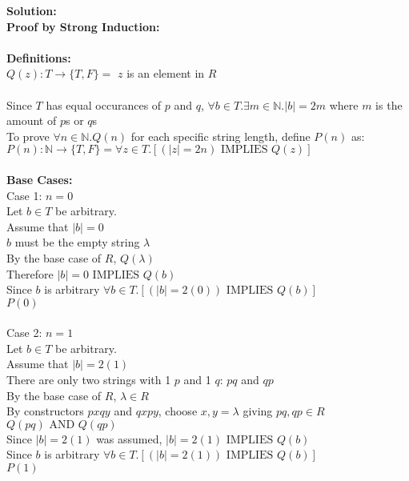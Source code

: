 \documentclass[11pt]{article}
\def\nats {{\mathbb N}}
\newcommand{\Implies}{\mbox{ IMPLIES }}
\newcommand{\And}{\mbox{ AND }}
\begin{document}
\begin{enumerate}
\begin{solution}
{\bf Solution:}\\
{\bf Proof by Strong Induction: }\\\\
{\bf Definitions:}\\
$Q(z): T\rightarrow\{T,F\} = $ $z$ is an element in $R$\\\\
Since $T$ has equal occurances of $p$ and $q$, $\forall b\in T.\exists m\in \nats. |b| = 2m$ where $m$ is the amount of $p$s or $q$s\\
To prove $\forall n\in \nats.Q(n)$ for each specific string length, define $P(n)$ as:\\
$P(n): \nats \rightarrow \{T,F\} = \forall z\in T.\left[(|z| = 2n) \Implies Q(z) \right]$\\\\
{\bf Base Cases: }\\
Case 1: $n=0$ \\
\null\quad Let $b\in T$ be arbitrary.\\
\null\qquad Assume that $|b| = 0$ \\
\null\qquad $b$ must be the empty string $\lambda$\\
\null\qquad By the base case of $R$, $Q(\lambda)$\\
\null\quad Therefore $|b|=0\Implies Q(b)$\\
Since $b$ is arbitrary $\forall b\in T.\left[(|b|=2(0))\Implies Q(b)\right]$\\
$P(0)$\\\\
Case 2: $n=1$ \\
\null\quad Let $b\in T$ be arbitrary.\\
\null\qquad Assume that $|b|=2(1)$\\
\null\qquad There are only two strings with 1 $p$ and 1 $q$: $pq$ and $qp$\\
\null\qquad By the base case of $R$, $\lambda\in R$ \\
\null\qquad By constructors $pxqy$ and $qxpy$, choose $x,y=\lambda$ giving $pq,qp\in R$ \\
\null\qquad $Q(pq)\And Q(qp)$\\
\null\quad Since $|b|=2(1)$ was assumed, $|b|=2(1)\Implies Q(b)$\\
Since $b$ is arbitrary $\forall b\in T.\left[(|b|=2(1))\Implies Q(b)\right]$\\
$P(1)$\\\\

\end{solution}
\end{enumerate}
\end{document}

